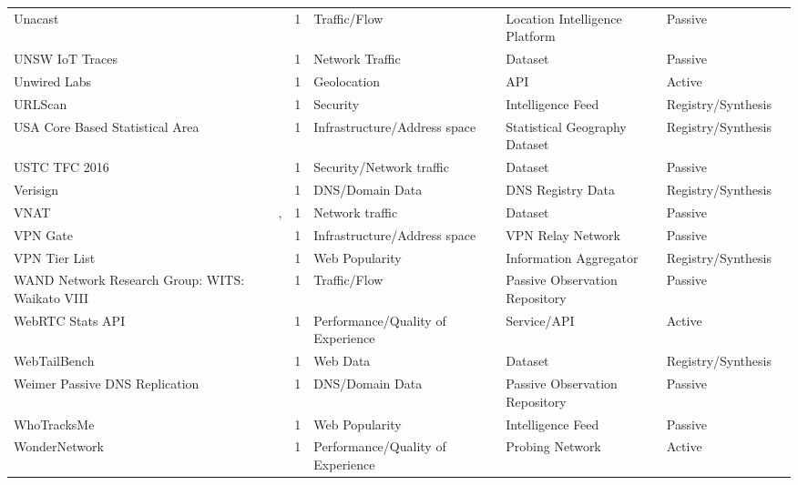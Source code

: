 \begin{table}[h!]
\begin{tabular}{lllllll}
Unacast & \cite{unacast} & 1 & Traffic/Flow & Location Intelligence Platform & Passive & \cite{10.1007/978-3-030-98785-5_6} \\
UNSW IoT Traces & \cite{unsw} & 1 & Network Traffic & Dataset & Passive & \cite{10.1145/3777912.3839801} \\
Unwired Labs & \cite{unwiredlabs} & 1 & Geolocation & API & Active & \cite{10.1145/3777912.3839813} \\
URLScan & \cite{urlscan} & 1 & Security & Intelligence Feed & Registry/Synthesis & \cite{10.1145/3777912.3809151} \\
USA Core Based Statistical Area & \cite{ucbsb} & 1 & Infrastructure/Address space & Statistical Geography Dataset & Registry/Synthesis & \cite{10.1007/978-3-030-72582-2_15} \\
USTC TFC 2016 & \cite{7899588} & 1 & Security/Network traffic & Dataset & Passive & \cite{10.1145/3777912.3839833} \\
Verisign & \cite{verisign} & 1 & DNS/Domain Data & DNS Registry Data & Registry/Synthesis & \cite{10.1145/3517745.3561434} \\
VNAT & \cite{10044382}, \cite{vnat} & 1 & Network traffic & Dataset & Passive & \cite{10.1145/3777912.3839833} \\
VPN Gate & \cite{2616448.2616470} & 1 & Infrastructure/Address space & VPN Relay Network & Passive & \cite{10.1007/978-3-030-98785-5_23} \\
VPN Tier List & \cite{vpntierlist} & 1 & Web Popularity & Information Aggregator & Registry/Synthesis & \cite{10.1007/978-3-031-28486-1_3} \\
WAND Network Research Group: WITS: Waikato VIII & \cite{wand} & 1 & Traffic/Flow & Passive Observation Repository & Passive & \cite{10.1007/978-3-030-72582-2_32} \\
WebRTC Stats API & \cite{webrtc} & 1 & Performance/Quality of Experience & Service/API & Active & \cite{10.1145/3487552.3487842} \\
WebTailBench & \cite{webtailbench} & 1 & Web Data & Dataset & Registry/Synthesis & \cite{10.1145/3777912.3839788} \\
Weimer Passive DNS Replication & \cite{pdns} & 1 & DNS/Domain Data & Passive Observation Repository & Passive & \cite{10.1145/3517745.3561431} \\
WhoTracksMe & \cite{whotracksme} & 1 & Web Popularity & Intelligence Feed & Passive & \cite{10.1145/3730567.3764427} \\
WonderNetwork & \cite{wonder} & 1 & Performance/Quality of Experience & Probing Network & Active & \cite{10.1145/3730567.3764427} \\

\end{tabular}
\end{table}
